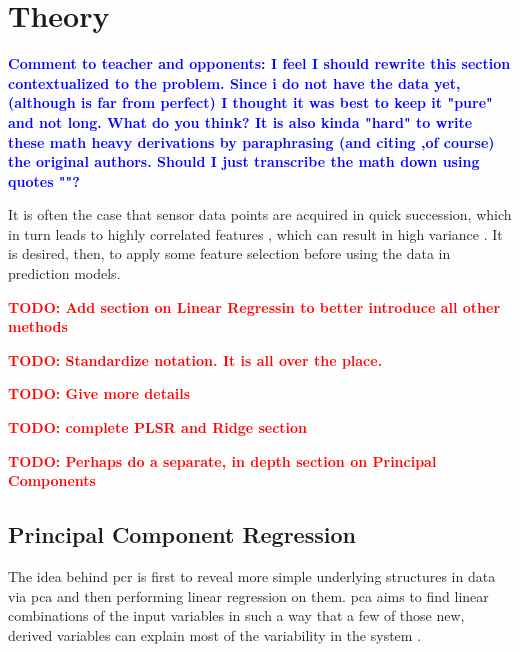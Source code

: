
\chapter{Theory}
\label{cha:theory}

\textbf{\textcolor{blue}{Comment to teacher and opponents: I feel I should rewrite this section contextualized to the problem. Since i do not have the data yet,  (although is far from perfect) I thought it was best to keep it "pure" and not long. What do you think? It is also kinda "hard" to write these math heavy derivations by paraphrasing (and citing ,of course) the original authors. Should I just transcribe the math down using quotes ""?}}

It is often the case that sensor data points are acquired in quick succession, which in turn leads to highly correlated features \cite{Bastuck_2019}, which can result in high variance \cite{friedman2001}. It is desired, then, to apply some feature selection before using the data in prediction models.

\textbf{\textcolor{red}{TODO: Add section on Linear Regressin to better introduce all other methods}}

\textbf{\textcolor{red}{TODO: Standardize notation.  It is all over the place.}}

\textbf{\textcolor{red}{TODO: Give more details}}

\textbf{\textcolor{red}{TODO: complete PLSR and Ridge section}}

\textbf{\textcolor{red}{TODO: Perhaps do a separate, in depth section on Principal Components}}

\section{Principal Component Regression}
\label{sec:pcr}

The idea behind \acrfull{pcr} is first to reveal more simple underlying structures in data \cite{shlens2014} via \acrfull{pca}  and then performing linear regression on them. \acrshort{pca} aims to find linear combinations of the input variables in such a way that a few of those new, derived variables can explain most of the variability in the system \cite{johnson2002}.

